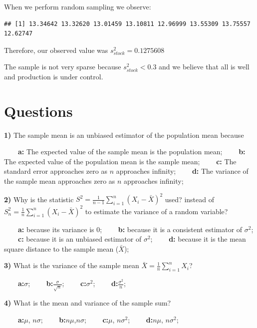 \documentclass[
]{book}
\begin{document}
When we perform random sampling we observe:

\begin{verbatim}
## [1] 13.34642 13.32620 13.01459 13.10811 12.96999 13.55309 13.75557 12.62747
\end{verbatim}

Therefore, our observed value was \(s^2_{stock}=0.1275608\)

The sample is not very sparse because \(s^2_{stock} < 0.3\) and we believe that all is well and production is under control.

\hypertarget{questions-7}{%
\section{Questions}\label{questions-7}}

\textbf{1)} The sample mean is an unbiased estimator of the population mean because

\textbf{\(\qquad\)a:} The expected value of the sample mean is the population mean;
\textbf{\(\qquad\)b:} The expected value of the population mean is the sample mean;
\textbf{\(\qquad\)c:} The standard error approaches zero as \(n\) approaches infinity;
\textbf{\(\qquad\)d:} The variance of the sample mean approaches zero as \(n\) approaches infinity;

\textbf{2)} Why is the statistic \(S^2=\frac{1}{n-1}\sum_{i=1}^{n}(X_i -\bar{X})^2\) used? instead of \(S_n^2=\frac{1}{n}\sum_{i=1}^{n}(X_i -\bar{X})^2\) to estimate the variance of a random variable?

\textbf{\(\qquad\)a:} because its variance is \(0\);
\textbf{\(\qquad\)b:} because it is a consistent estimator of \(\sigma^2\);
\textbf{\(\qquad\)c:} because it is an unbiased estimator of \(\sigma^2\);
\textbf{\(\qquad\)d:} because it is the mean square distance to the sample mean (\(\bar{X}\));

\textbf{3)} What is the variance of the sample mean \(\bar{X}=\frac{1}{n}\sum_{i=1}^n X_i\)?

\textbf{\(\qquad\)a:}\(\sigma\);
\textbf{\(\qquad\)b:}\(\frac{\sigma}{\sqrt{n}}\);
\textbf{\(\qquad\)c:}\(\sigma^2\);
\textbf{\(\qquad\)d:}\(\frac{\sigma^2}{n}\);

\textbf{4)} What is the mean and variance of the sample sum?

\textbf{\(\qquad\)a:}\(\mu\), \(n\sigma\);
\textbf{\(\qquad\)b:}\(n\mu\),\(n\sigma\);
\textbf{\(\qquad\)c:}\(\mu\), \(n\sigma^2\);
\textbf{\(\qquad\)d:}\(n\mu\), \(n\sigma^2\);
\end{document}
